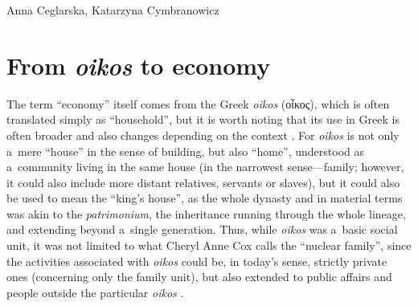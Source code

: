 \begin{artengenv2auth}{Anna Ceglarska, Katarzyna Cymbranowicz}
\section{From \textit{oikos} to economy}

The term ``economy'' itself comes from the Greek \textit{oikos} (\textgreek{οἶκος}),
 which is often translated simply as ``household'', but it is worth noting that its use in Greek is often broader and also changes depending on the context 
\parencite[][p.2]{roy_polis_1999}. %
 For \textit{oikos} is not only a~mere ``house'' in the sense of building, but also ``home'', understood as a~community living in the same house (in the narrowest sense---family; however, it could also include more distant relatives, servants or slaves), but it could also be used to mean the ``king's house'', as the whole dynasty 
\parencite[][V.31, VI.9]{herodotus_histories_1920} %
 and in material terms was akin to the \textit{patrimonium}, the inheritance running through the whole lineage, and extending beyond a~single generation. Thus, while \textit{oikos} was a~basic social unit, it was not limited to what Cheryl Anne Cox 
\parencite*[][]{cox_household_1998} %
 calls the ``nuclear family'', since the activities associated with \textit{oikos} could be, in today's sense, strictly private ones (concerning only the family unit), but also extended to public affairs and people outside the particular \textit{oikos} 
\parencite[][]{martin_urban_2016}.%





\end{artengenv2auth}
